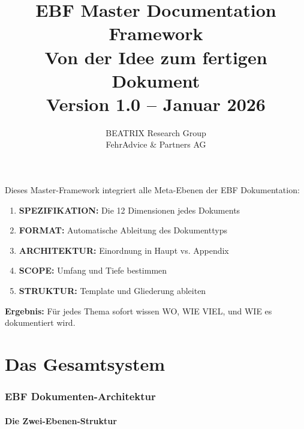 \documentclass[12pt,a4paper]{article}
\title{\Huge\textbf{EBF Master Documentation Framework}\\[1em]
\Large Von der Idee zum fertigen Dokument\\[0.5em]
\normalsize Version 1.0 -- Januar 2026}
\author{BEATRIX Research Group\\FehrAdvice \& Partners AG}
\date{}
\begin{document}
\maketitle

\begin{tcolorbox}[colback=bcmblue!10!white, colframe=bcmblue, 
    title=\textbf{Zweck dieses Frameworks}]
    
Dieses Master-Framework integriert alle Meta-Ebenen der EBF Dokumentation:

\begin{enumerate}[nosep]
\item \textbf{SPEZIFIKATION:} Die 12 Dimensionen jedes Dokuments
\item \textbf{FORMAT:} Automatische Ableitung des Dokumenttyps
\item \textbf{ARCHITEKTUR:} Einordnung in Haupt vs. Appendix
\item \textbf{SCOPE:} Umfang und Tiefe bestimmen
\item \textbf{STRUKTUR:} Template und Gliederung ableiten
\end{enumerate}

\textbf{Ergebnis:} Für jedes Thema sofort wissen WO, WIE VIEL, und WIE es dokumentiert wird.

\end{tcolorbox}

\tableofcontents
\newpage

%
%

\part{Das Gesamtsystem}

\section{EBF Dokumenten-Architektur}

\subsection{Die Zwei-Ebenen-Struktur}
\end{document}

